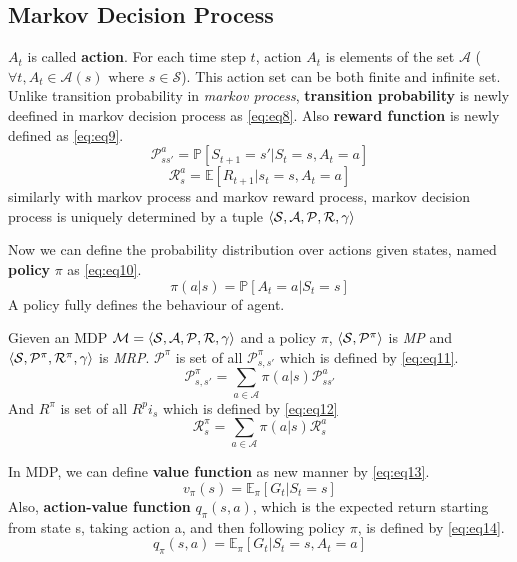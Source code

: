 \documentclass[
	10pt, %
]{article}
\theoremstyle{plain}
\def\n{\newline}
\newcommand{\mbb}[1]{\mathbb{#1}}
\newcommand{\mc}[1]{\mathcal{#1}}
\newcommand{\tb}[1]{\textbf{#1}}
\newcommand{\ti}[1]{\textit{#1}}
\numberwithin{equation}{subsection} %
\begin{document}
\subsection{Markov Decision Process}
$A_t$ is called \tb{action}. For each time step $t$, action $A_t$ is elements of the set $\mc{A}$ ($\forall t, A_t \in \mc{A}(s) \text{ where } s \in \mc{S}$). This action set can be both finite and infinite set. Unlike transition probability in \ti{markov process}, \tb{transition probability} is newly deefined in markov decision process as \cref{eq:eq8}. Also \tb{reward function} is newly defined as \cref{eq:eq9}.
\begin{equation} \label{eq:eq8}
    \mc{P}_{ss'}^a = \mbb{P}[S_{t+1}=s'|S_t=s, A_t=a]
\end{equation}
\begin{equation} \label{eq:eq9}
    \mc{R}_{s}^a = \mbb{E}[R_{t+1}|s_{t}=s,A_t=a]
\end{equation}
similarly with markov process and markov reward process, markov decision process is uniquely determined by a tuple $\braket{\mc{S}, \mc{A}, \mc{P}, \mc{R}, \gamma}$

Now we can define the probability distribution over actions given states, named \tb{policy} $\pi$ as \cref{eq:eq10}.
\begin{equation} \label{eq:eq10}
    \pi(a|s) = \mbb{P}[A_t=a|S_t=s]
\end{equation}
A policy fully defines the behaviour of agent.
\n

Gieven an MDP $\mc{M}=\braket{\mc{S, A, P, R}, \gamma}$ and a policy $\pi$, $\braket{\mc{S}, \mc{P}^\pi}$ is \ti{MP} and $\braket{\mc{S},\mc{P}^\pi, \mc{R}^\pi, \gamma}$ is \ti{MRP}. $\mc{P}^\pi$ is set of all $\mc{P}^\pi_{s,s'}$ which is defined by \cref{eq:eq11}.
\begin{equation} \label{eq:eq11}
    \mc{P}^\pi_{s,s'} = \sum_{a \in \mc{A}}\pi(a|s)\mc{P}^a_{ss'}
\end{equation}
And $R^\pi$ is set of all $R^pi_s$ which is defined by \cref{eq:eq12}
\begin{equation} \label{eq:eq12}
    \mc{R}^\pi_s = \sum_{a \in \mc{A}}\pi(a|s)\mc{R}^a_s
\end{equation}
\n

In MDP, we can define \tb{value function} as new manner by \cref{eq:eq13}.
\begin{equation} \label{eq:eq13}
    v_\pi(s) = \mbb{E}_\pi[G_t|S_t=s]
\end{equation}
Also, \tb{action-value function} $q_\pi(s,a)$, which is the expected return starting from state s, taking action a, and then following policy $\pi$, is defined by \cref{eq:eq14}.
\begin{equation} \label{eq:eq14}
    q_\pi(s,a) = \mbb{E}_\pi[G_t|S_t=s, A_t=a]
\end{equation}
\n
\end{document}
